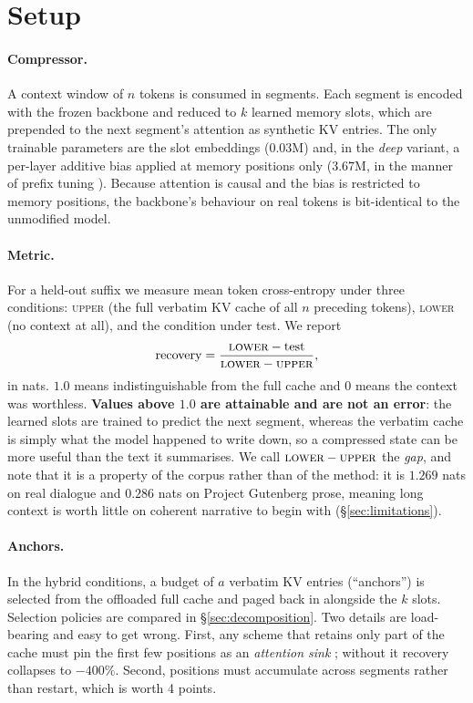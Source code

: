 \documentclass[11pt]{article}
\begin{document}
\section{Setup}
\label{sec:setup}

\paragraph{Compressor.}
A context window of $n$ tokens is consumed in segments. Each segment is encoded
with the frozen backbone and reduced to $k$ learned memory slots, which are
prepended to the next segment's attention as synthetic KV entries. The only
trainable parameters are the slot embeddings ($0.03$M) and, in the \emph{deep}
variant, a per-layer additive bias applied at memory positions only
($3.67$M, in the manner of prefix tuning \citep{ptuningv2}). Because attention is
causal and the bias is restricted to memory positions, the backbone's behaviour
on real tokens is bit-identical to the unmodified model.

\paragraph{Metric.}
For a held-out suffix we measure mean token cross-entropy under three
conditions: \textsc{upper} (the full verbatim KV cache of all $n$ preceding
tokens), \textsc{lower} (no context at all), and the condition under test. We
report
\begin{equation}
\text{recovery} = \frac{\textsc{lower} - \text{test}}{\textsc{lower} - \textsc{upper}},
\label{eq:recovery}
\end{equation}
in nats. $1.0$ means indistinguishable from the full cache and $0$ means the
context was worthless. \textbf{Values above $1.0$ are attainable and are not an
error}: the learned slots are trained to predict the next segment, whereas the
verbatim cache is simply what the model happened to write down, so a compressed
state can be more useful than the text it summarises. We call
$\textsc{lower}-\textsc{upper}$ the \emph{gap}, and note that it is a property of
the corpus rather than of the method: it is $1.269$ nats on real dialogue and
$0.286$ nats on Project Gutenberg prose, meaning long context is worth little on
coherent narrative to begin with (\S\ref{sec:limitations}).

\paragraph{Anchors.}
In the hybrid conditions, a budget of $a$ verbatim KV entries (``anchors'') is
selected from the offloaded full cache and paged back in alongside the $k$ slots.
Selection policies are compared in \S\ref{sec:decomposition}. Two details are
load-bearing and easy to get wrong. First, any scheme that retains only part of
the cache must pin the first few positions as an \emph{attention sink}
\citep{streamingllm}; without it recovery collapses to $-400\%$. Second,
positions must accumulate across segments rather than restart, which is worth
4 points.
\end{document}
